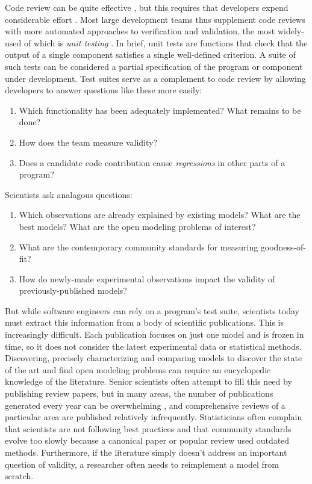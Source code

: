 \documentclass[9pt]{sig-alternate}
\begin{document}
Code review can be quite effective \cite{codereview}, but this requires that developers  expend considerable effort \cite{kemerer2009impact}. 
Most large development teams thus supplement code reviews with more {automated} approaches to verification and validation, the most widely-used  of which is \emph{unit testing} \cite{beck2003}. In brief, unit tests are functions that check that the output of a single component satisfies a single well-defined  criterion. A suite of such tests can be considered a partial specification of the program or component under development.  Test suites serve as a complement to code review by allowing developers to answer questions like these more easily:
\begin{enumerate}
\item Which functionality has been adequately implemented? What remains to be done?
\item How does the team measure validity?
\item Does a candidate code contribution cause \emph{regressions} in other parts of a program?
\end{enumerate}
Scientists ask analagous questions:
\begin{enumerate}
\item Which observations are already explained by existing models? What are the best models? What are the open modeling problems of interest?
\item What are the contemporary community standards for measuring goodness-of-fit?
\item How do newly-made experimental observations impact the validity of previously-published models?
\end{enumerate}
But while software engineers can rely on a program's test suite, scientists today must extract this information from a body of scientific publications. This is increasingly difficult. Each publication focuses on just one model and is frozen in time, so it does not consider the latest experimental data or statistical methods. Discovering, precisely characterizing and comparing models to discover the state of the art and find open modeling problems can require an encyclopedic knowledge of the literature. Senior scientists often attempt to fill this need by publishing review papers, but in many areas, the number of publications generated every year can be overwhelming \cite{jinha_article_2010}, and comprehensive reviews of a particular area are published relatively infrequently. Statisticians often complain that scientists are not following best practices and that community standards evolve too slowly because a canonical paper or popular review used outdated methods. Furthermore, if the literature simply doesn't address an important question of validity, a researcher often needs to reimplement a model from scratch. 
\end{document}
